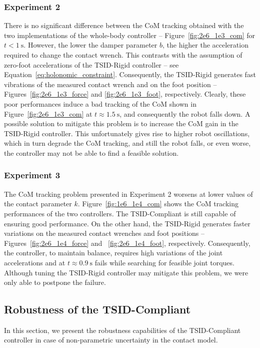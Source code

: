 \subsubsection{Experiment 2} 
There is no significant difference between the CoM tracking obtained with the two implementations of the whole-body controller -- Figure~\ref{fig:2e6_1e3_com} for $t < \SI{1}{\second}$. However, the lower the damper parameter $b$, the higher the acceleration required to change the contact wrench. This contrasts with the assumption of zero-foot accelerations of the TSID-Rigid controller -- see Equation~\eqref{eq:holonomic_constraint}. Consequently, the TSID-Rigid generates fast vibrations of the measured contact wrench and on the foot position -- Figures~\ref{fig:2e6_1e3_force} and \ref{fig:2e6_1e3_foot}, respectively. Clearly, these poor performances induce a bad tracking of the CoM shown in Figure~\ref{fig:2e6_1e3_com} at $t\approx \SI{1.5}{\second}$, and consequently the robot falls down. A possible solution to mitigate this problem is to increase the CoM gain in the TSID-Rigid controller. This unfortunately gives rise to higher robot oscillations, which in turn degrade the CoM tracking, and still the robot falls, or even worse, the controller may not be able to find a feasible solution.
\subsubsection{Experiment 3} 
The CoM tracking problem presented in Experiment 2 worsens at lower values of the contact parameter $k$.
Figure~\ref{fig:1e6_1e4_com} shows the CoM tracking performances of the two controllers. The TSID-Compliant is still capable of ensuring good performance. On the other hand, the TSID-Rigid generates faster variations on the measured contact wrenches and foot positions -- Figures~\ref{fig:2e6_1e4_force} and ~\ref{fig:2e6_1e4_foot}, respectively. Consequently, the controller, to maintain balance, requires high variations of the joint accelerations and at $t\approx\SI{0.9}{\second}$ fails while searching for feasible joint torques. Although tuning the TSID-Rigid controller may mitigate this problem, we were only able to postpone the failure. 

\subsection{Robustness of the TSID-Compliant}
In this section, we present the robustness capabilities of the TSID-Compliant controller in case of non-parametric uncertainty in the contact model.

